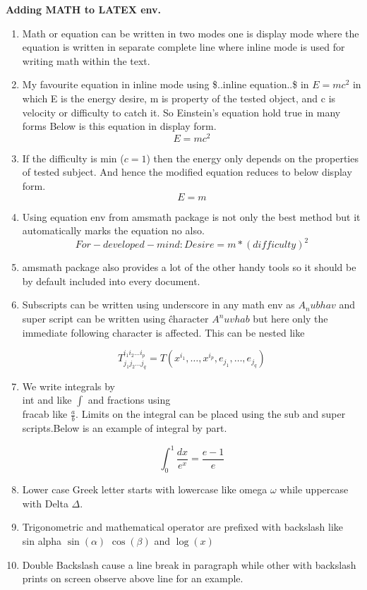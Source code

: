 \documentclass[12pt, letterpaper]{article}
\begin{document}
\textbf{Adding MATH to LATEX env.}
\begin{enumerate}

\item Math or equation can be written in two modes one is display mode where the equation is written in separate complete line where inline mode is used for writing math within the text.
\item My favourite equation in inline mode using \$..inline equation..\$ in $E=mc^2$ in which E is the energy desire, m is property of the tested object, and c is velocity or difficulty to catch it. So Einstein's equation hold true in many forms Below is this equation in display form.
\[E=mc^2\]
\item If the difficulty is min (\begin{math} c=1 \end{math}) then the energy only depends on the properties of tested subject. And hence the modified equation reduces to below display form.
\begin{equation}
    E=m
\end{equation}
\item Using equation env from amsmath package is not only the best method but it automatically marks the equation no also.
\begin{equation}
    For-developed-mind: Desire = m*(difficulty)^2
\end{equation}
\item amsmath package also provides a lot of the other handy tools so it should be by default included into every document.
\item Subscripts can be written using underscore in any math env as \emph{$A_nubhav$} and super script can be written using \^ character \textbf{$A^nuvhab$} but here only the immediate following character is affected. This can be nested like

\[ T^{i_1 i_2 \dots i_p}_{j_1 j_2 \dots j_q} = T(x^{i_1},\dots,x^{i_p},e_{j_1},\dots,e_{j_q}) \]

\item We write integrals by \\int and like $\int$ and fractions using \\frac{a}{b} like $\frac{a}{b}$. Limits on the integral can be placed using the sub and super scripts.Below is an example of integral by part.

\[\int_0^1 \frac{dx}{e^x} = \frac{e-1}{e} \]

\item Lower case Greek letter starts with lowercase like omega $\omega$ while uppercase with Delta $\Delta$.

\item Trigonometric and mathematical operator are prefixed with backslash like \\sin alpha $\sin(\alpha)$ $\cos(\beta)$ and $\log(x)$

\item Double Backslash cause a line break in paragraph while other with backslash prints on screen observe above line for an example.

\end{enumerate}
\end{document}
